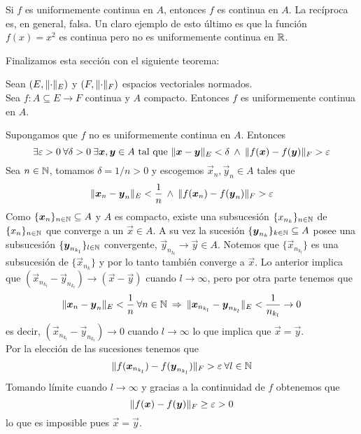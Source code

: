 \begin{proposicion}
Si $f$ es uniformemente continua en $A$, entonces $f$ es continua en $A$. La rec\'iproca es, en general, falsa. Un claro ejemplo de esto \'ultimo es que la funci\'on $f(x)=x^2$ es continua pero no es uniformemente continua en $\mathbb{R}$.
\end{proposicion}

Finalizamos esta secci\'on con el siguiente teorema:

\begin{teorema}\label{teo:continuaEnCompactoEsuniformementeContinua}
Sean $(E,\lVert\cdot\rVert_E)$ y $(F,\lVert\cdot\rVert_F)$ espacios vectoriales normados.
\\Sea $f:A\subseteq E\to F$ continua y $A$ compacto. Entonces $f$ es uniformemente continua en $A$.
\end{teorema}

\begin{demostracion}
Supongamos que $f$ no es uniformemente continua en $A$. Entonces 
$$\exists \varepsilon >0\:\forall \delta >0\: \exists \boldsymbol{x},\boldsymbol{y}\in A \text{ tal que } \lVert\boldsymbol{x}-\boldsymbol{y}\rVert_E<\delta\: \wedge\: \lVert f(\boldsymbol{x})-f(\boldsymbol{y})\rVert_F>\varepsilon$$ 
Sea $n\in\mathbb{N}$, tomamos $\delta=1/n >0 $ y escogemos $\vec{x}_n,\vec{y}_n\in A$ tales que
$$\lVert\boldsymbol{x}_n-\boldsymbol{y}_n\rVert_E<\frac{1}{n}\:\wedge\:\lVert f(\boldsymbol{x}_n)-f(\boldsymbol{y}_n)\rVert_F>\varepsilon$$
Como $\{\boldsymbol{x}_n\}_{n\in \mathbb{N}}\subseteq A$ y $A$ es compacto, existe una subsucesi\'on $\{x_{n_k}\}_{n\in \mathbb{N}}$ de $\{x_{n}\}_{n\in \mathbb{N}}$ que converge a un $\vec{x}\in A$. A su vez la sucesi\'on $\{\boldsymbol{y}_{n_k}\}_{k\in\mathbb{N}}\subseteq A$ posee una subsucesi\'on $\{\boldsymbol{y}_{n_{k_l}}\}_{l\in\mathbb{N}}$ convergente, $\vec{y}_{n_{k_l}}\rightarrow \vec{y}\in A$. Notemos que $\{\vec{x}_{n_{k_l}}\}$ es una subsucesi\'on de $\{\vec{x}_{n_k}\}$ y por lo tanto tambi\'en converge a $\vec{x}$. Lo anterior implica que $(\vec{x}_{n_{k_l}}-\vec{y}_{n_{k_l}})\rightarrow (\vec{x}-\vec{y})$ cuando $l\rightarrow\infty$, pero por otra parte tenemos que
$$\lVert\boldsymbol{x}_n-\boldsymbol{y}_n\rVert_E<\frac{1}{n}\:\forall n\in\mathbb{N}\:\Rightarrow\:\lVert\boldsymbol{x}_{n_{k_l}}-\boldsymbol{y}_{n_{k_l}}\rVert_E<\frac{1}{n_{k_l}}\rightarrow 0$$ 
es decir, $(\vec{x}_{n_{k_l}}-\vec{y}_{n_{k_l}})\rightarrow 0$ cuando $l\rightarrow \infty$ lo que implica que $\vec{x}=\vec{y}$.
\\Por la elecci\'on de las sucesiones tenemos que
$$\lVert f(\boldsymbol{x}_{n_{k_l}})-f(\boldsymbol{y}_{n_{k_l}})\rVert_F>\varepsilon\:\forall l\in\mathbb{N}$$ 
Tomando l\'imite cuando $l\rightarrow\infty$ y gracias a la continuidad de $f$ obtenemos que 
$$\lVert f(\boldsymbol{x})-f(\boldsymbol{y})\rVert_F\geq \varepsilon >0$$ 
lo que es imposible pues $\vec{x}=\vec{y}$.
\end{demostracion}

